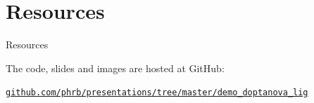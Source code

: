 \documentclass[10pt, compress, aspectratio=169, xcolor={table,usenames,dvipsnames}]{beamer}
\begin{document}
\section{Resources}
\label{sec:orgb6459ce}
\begin{frame}[label={sec:org25fccd1}]{Resources}
\begin{center}
The code, slides and images are \alert{hosted at GitHub}:

\href{https://github.com/phrb/presentations/tree/master/demo\_doptanova\_lig}{\texttt{github.com/phrb/presentations/tree/master/demo\_doptanova\_lig}}
\end{center}
\end{frame}
\maketitle
\end{document}
